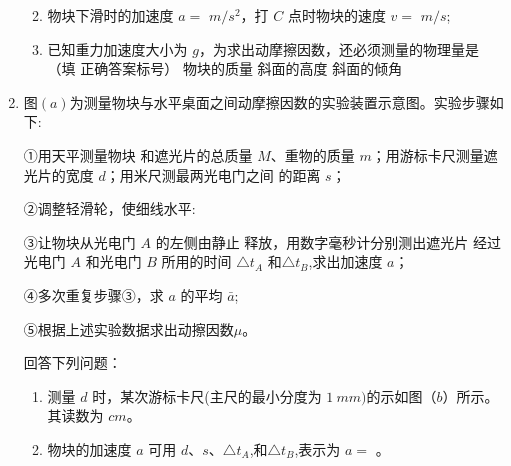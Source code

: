 \begin{enumerate}
\begin{enumerate}
\renewcommand{\labelenumi}{\arabic{enumi}.}
\item
物块下滑时的加速度 $ a= $  $ m/s^{2} $，打 $ C $ 点时物块的速度 $ v= $  $ m/s $;
\item 
已知重力加速度大小为 $ g $，为求出动摩擦因数，还必须测量的物理量是
（填
正确答案标号）
\threechoices
{物块的质量}
{斜面的高度}
{斜面的倾角}

\end{enumerate}




\newpage
\item
{}
图$ (a) $为测量物块与水平桌面之间动摩擦因数的实验装置示意图。实验步骤如下$ : $ 

①用天平测量物块
和遮光片的总质量 $ M $、重物的质量 $ m $；用游标卡尺测量遮光片的宽度 $ d $；用米尺测最两光电门之间
的距离 $ s $；

②调整轻滑轮，使细线水平$ : $


③让物块从光电门 $ A $ 的左侧由静止
释放，用数字毫秒计分别测出遮光片
经过光电门 $ A $ 和光电门 $ B $ 所用的时间
$ \triangle t_{A} $ 和$ \triangle t_{B} $,求出加速度 $ a $；

④多次重复步骤③，求 $ a $ 的平均 $ \bar{a} $;

⑤根据上述实验数据求出动擦因数$ \mu $。

\begin{figure}[h!]
\centering

 \qquad 
  
\end{figure}




回答下列问题：
\begin{enumerate}
\renewcommand{\labelenumi}{\arabic{enumi}.}
\item
测量 $ d $ 时，某次游标卡尺(主尺的最小分度为 $ 1 \ mm) $的示如图（$ b $）所示。其读数为
$ cm $。

\item 
物块的加速度 $ a $ 可用 $ d $、$ s $、$ \triangle t_{A} $,和$ \triangle t_{B} $,表示为 $ a =$ 。 




\end{enumerate}
\end{enumerate}
